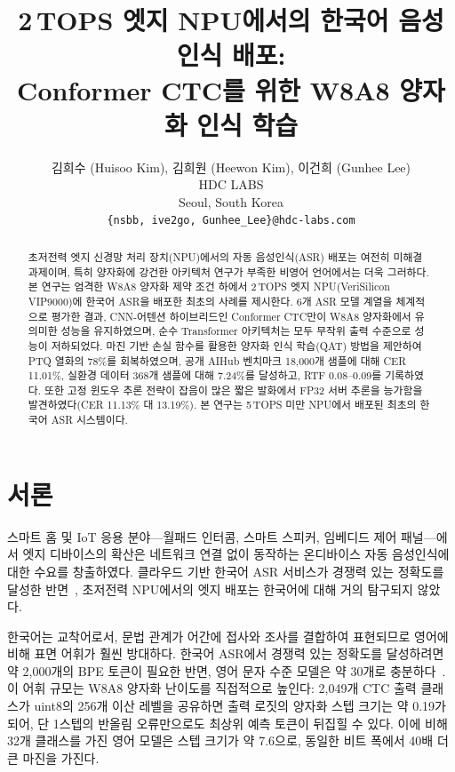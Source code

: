 \documentclass[a4paper,11pt,twocolumn]{article}
\title{\Large\bfseries 2\,TOPS 엣지 NPU에서의 한국어 음성인식 배포:\\Conformer CTC를 위한 W8A8 양자화 인식 학습}
\author{김희수 (Huisoo Kim), 김희원 (Heewon Kim), 이건희 (Gunhee Lee)\\[0.3em]
HDC LABS\\
Seoul, South Korea\\
\texttt{\{nsbb, ive2go, Gunhee\_Lee\}@hdc-labs.com}}
\date{}
\begin{document}
\maketitle

\begin{abstract}
초저전력 엣지 신경망 처리 장치(NPU)에서의 자동 음성인식(ASR) 배포는 여전히 미해결 과제이며, 특히 양자화에 강건한 아키텍처 연구가 부족한 비영어 언어에서는 더욱 그러하다. 본 연구는 엄격한 W8A8 양자화 제약 조건 하에서 2\,TOPS 엣지 NPU(VeriSilicon VIP9000)에 한국어 ASR을 배포한 최초의 사례를 제시한다. 6개 ASR 모델 계열을 체계적으로 평가한 결과, CNN-어텐션 하이브리드인 Conformer CTC만이 W8A8 양자화에서 유의미한 성능을 유지하였으며, 순수 Transformer 아키텍처는 모두 무작위 출력 수준으로 성능이 저하되었다. 마진 기반 손실 함수를 활용한 양자화 인식 학습(QAT) 방법을 제안하여 PTQ 열화의 78\%를 회복하였으며, 공개 AIHub 벤치마크 18,000개 샘플에 대해 CER 11.01\%, 실환경 데이터 368개 샘플에 대해 7.24\%를 달성하고, RTF 0.08--0.09를 기록하였다. 또한 고정 윈도우 추론 전략이 잡음이 많은 짧은 발화에서 FP32 서버 추론을 능가함을 발견하였다(CER 11.13\% 대 13.19\%). 본 연구는 5\,TOPS 미만 NPU에서 배포된 최초의 한국어 ASR 시스템이다.
\end{abstract}

\section{서론}

스마트 홈 및 IoT 응용 분야---월패드 인터콤, 스마트 스피커, 임베디드 제어 패널---에서 엣지 디바이스의 확산은 네트워크 연결 없이 동작하는 온디바이스 자동 음성인식에 대한 수요를 창출하였다. 클라우드 기반 한국어 ASR 서비스가 경쟁력 있는 정확도를 달성한 반면~\cite{returnzero,clova}, 초저전력 NPU에서의 엣지 배포는 한국어에 대해 거의 탐구되지 않았다.

한국어는 교착어로서, 문법 관계가 어간에 접사와 조사를 결합하여 표현되므로 영어에 비해 표면 어휘가 훨씬 방대하다. 한국어 ASR에서 경쟁력 있는 정확도를 달성하려면 약 2,000개의 BPE 토큰이 필요한 반면, 영어 문자 수준 모델은 약 30개로 충분하다~\cite{koo2021}. 이 어휘 규모는 W8A8 양자화 난이도를 직접적으로 높인다: 2,049개 CTC 출력 클래스가 uint8의 256개 이산 레벨을 공유하면 출력 로짓의 양자화 스텝 크기는 약 0.19가 되어, 단 1스텝의 반올림 오류만으로도 최상위 예측 토큰이 뒤집힐 수 있다. 이에 비해 32개 클래스를 가진 영어 모델은 스텝 크기가 약 7.6으로, 동일한 비트 폭에서 40배 더 큰 마진을 가진다.
\end{document}
